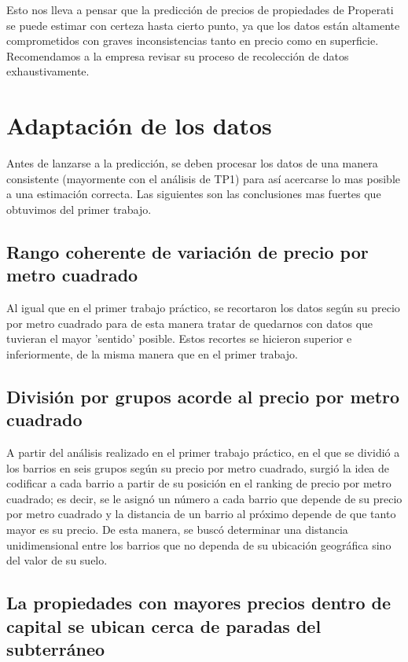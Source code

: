 \documentclass[a4paper, 10pt]{article}
\begin{document}
		Esto nos lleva a pensar que la predicción de precios de propiedades de Properati se puede estimar con certeza hasta cierto punto, ya que los datos están altamente comprometidos con graves inconsistencias tanto en precio como en superficie. Recomendamos a la empresa revisar su proceso de recolección de datos exhaustivamente. 		
		
	\section{Adaptación de los datos}
		
		Antes de lanzarse a la predicción, se deben procesar los datos de una manera consistente (mayormente con el análisis de TP1) para así acercarse lo mas posible a una estimación correcta. Las siguientes son las conclusiones mas fuertes que obtuvimos del primer trabajo.
		
		\subsection{Rango coherente de variación de precio por metro cuadrado}
		Al igual que en el primer trabajo práctico, se recortaron los datos según su precio por metro cuadrado para de esta manera tratar de
		quedarnos con datos que tuvieran el mayor 'sentido' posible. Estos recortes se hicieron superior e inferiormente, de la misma manera
		que en el primer trabajo.
		
		\subsection{División por grupos acorde al precio por metro cuadrado}
		A partir del análisis realizado en el primer trabajo práctico, en el que se dividió a los barrios en seis grupos según su precio por
		metro cuadrado, surgió la idea de codificar a cada barrio a partir de su posición en el ranking de precio por metro cuadrado; es decir,
		se le asignó un número a cada barrio que depende de su precio por metro cuadrado y la distancia de un barrio al próximo depende de que
		tanto mayor es su precio. De esta manera, se buscó determinar una distancia unidimensional entre los barrios que no dependa de su
		ubicación geográfica sino del valor de su suelo.
			
		\subsection{La propiedades con mayores precios dentro de capital se ubican cerca de paradas del subterráneo}
		
\end{document}

